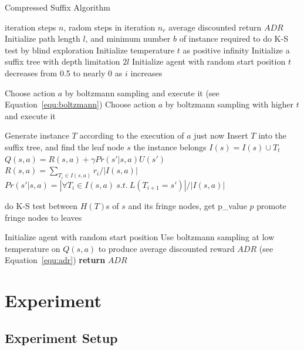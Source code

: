 \documentclass{article}
\begin{document}
\begin{algorithm}[h]
	\renewcommand{\algorithmicrequire}{\textbf{Input:}}
	\renewcommand{\algorithmicensure}{\textbf{Output:}}
	\caption{Compressed Suffix Algorithm}
	\label{alg:CSM}
	\begin{algorithmic}[1]
		\REQUIRE iteration steps $n$, radom steps in iteration $n_r$
		\ENSURE average discounted return $ADR$
    \STATE Initialize path length $l$, and minimum number $b$ of instance required to do K-S test
    by blind exploration
    \STATE Initialize temperature $t$ as positive infinity
    \STATE Initialize a suffix tree with depth limitation $2l$
    \STATE Initialize agent with random start position
		    \STATE $t$ decreases from 0.5 to nearly 0 as $i$ increases
      \ENDIF

      \STATE Choose action $a$ by boltzmann sampling and execute it (see Equation~\ref{equ:boltzmann})
        \STATE Choose action $a$ by boltzmann sampling with higher $t$ and execute it
      \ENDWHILE

      \STATE Generate instance $T$ according to the execution of $a$ just now
      \STATE Insert $T$ into the suffix tree, and find the leaf node $s$ the instance belongs
      \STATE $I(s) = I(s) \cup {T_t}$
      \STATE $Q(s,a) = R(s,a) + \gamma Pr(s'|s,a)U(s')$
      \STATE $R(s,a) = {\sum_{T_i \in I(s,a)}r_i}/{|I(s,a)|}$
      \STATE $Pr(s'|s,a) = {|\forall{T_i \in I(s,a) \ s.t. \ L(T_{i+1} = s')}|} / {|I(s,a)|}$
      
        \STATE do K-S test between $H(T)$s of $s$ and its fringe nodes, get p\_value $p$ 
          \STATE promote fringe nodes to leaves
        \ENDIF
      \ENDIF

        \STATE Initialize agent with random start position
      \ENDIF
    \ENDFOR
    \STATE Use boltzmann sampling at low temperature on $Q(s, a)$ to produce average
    discounted reward $ADR$ (see Equation~\ref{equ:adr})
		\STATE \textbf{return} $ADR$
	\end{algorithmic}  
\end{algorithm}

\section{Experiment}

\subsection{Experiment Setup}
\end{document}
